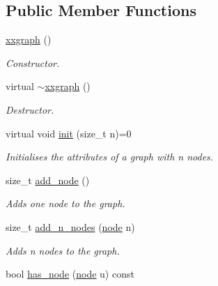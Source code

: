 \subsection*{Public Member Functions}
\begin{DoxyCompactItemize}
\item 
\hyperlink{classlgraph_1_1utils_1_1xxgraph_a24cdfcb0cc82745b1ea44595b23f61bc}{xxgraph} ()\hypertarget{classlgraph_1_1utils_1_1xxgraph_a24cdfcb0cc82745b1ea44595b23f61bc}{}\label{classlgraph_1_1utils_1_1xxgraph_a24cdfcb0cc82745b1ea44595b23f61bc}

\begin{DoxyCompactList}\small\item\em Constructor. \end{DoxyCompactList}\item 
virtual \hyperlink{classlgraph_1_1utils_1_1xxgraph_a45d2fb9099f70fc2a8b1c651f4c6d6ce}{$\sim$xxgraph} ()\hypertarget{classlgraph_1_1utils_1_1xxgraph_a45d2fb9099f70fc2a8b1c651f4c6d6ce}{}\label{classlgraph_1_1utils_1_1xxgraph_a45d2fb9099f70fc2a8b1c651f4c6d6ce}

\begin{DoxyCompactList}\small\item\em Destructor. \end{DoxyCompactList}\item 
virtual void \hyperlink{classlgraph_1_1utils_1_1xxgraph_a2ac8b3e71fa0550248c692a19ea04d0d}{init} (size\+\_\+t n)=0
\begin{DoxyCompactList}\small\item\em Initialises the attributes of a graph with {\itshape n} nodes. \end{DoxyCompactList}\item 
size\+\_\+t \hyperlink{classlgraph_1_1utils_1_1xxgraph_af41baf2c098e872731ad646aeec1b382}{add\+\_\+node} ()
\begin{DoxyCompactList}\small\item\em Adds one node to the graph. \end{DoxyCompactList}\item 
size\+\_\+t \hyperlink{classlgraph_1_1utils_1_1xxgraph_af4f3782c1a55f73c6f34f2f2c26fb404}{add\+\_\+n\+\_\+nodes} (\hyperlink{namespacelgraph_1_1utils_a7bd66ede3805ef121bc2835bd48de0cf}{node} n)
\begin{DoxyCompactList}\small\item\em Adds {\itshape n} nodes to the graph. \end{DoxyCompactList}\item 
bool \hyperlink{classlgraph_1_1utils_1_1xxgraph_a026ab064c2be26790cc1f547be2157c9}{has\+\_\+node} (\hyperlink{namespacelgraph_1_1utils_a7bd66ede3805ef121bc2835bd48de0cf}{node} u) const \hypertarget{classlgraph_1_1utils_1_1xxgraph_a026ab064c2be26790cc1f547be2157c9}{}\label{classlgraph_1_1utils_1_1xxgraph_a026ab064c2be26790cc1f547be2157c9}


\end{DoxyCompactItemize}

